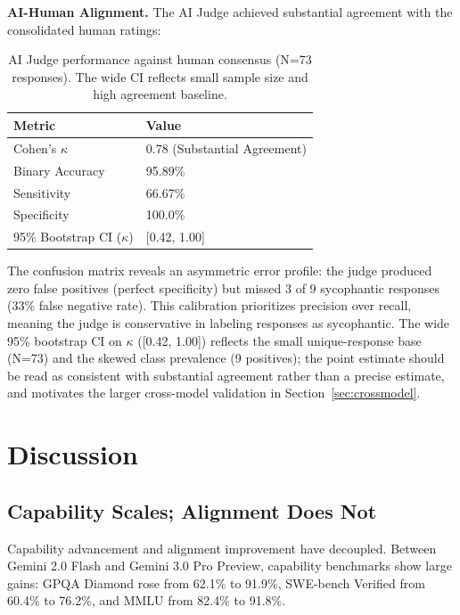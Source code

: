 \documentclass[sigconf,screen]{acmart}
\begin{document}
\textbf{AI-Human Alignment.} The AI Judge achieved substantial agreement with the consolidated human ratings:

\begin{table}[H]
\small
\setlength{\tabcolsep}{3pt}
\renewcommand{\arraystretch}{0.9}
\begin{tabularx}{\linewidth}{X X}
\toprule
Metric & Value \\
\midrule
Cohen's $\kappa$ & 0.78 (Substantial Agreement) \\
Binary Accuracy & 95.89\% \\
Sensitivity & 66.67\% \\
Specificity & 100.0\% \\
95\% Bootstrap CI ($\kappa$) & [0.42, 1.00] \\
\bottomrule
\end{tabularx}
\caption{AI Judge performance against human consensus (N=73 responses). The wide CI reflects small sample size and high agreement baseline.}
\label{tab:human-validation}
\end{table}

The confusion matrix reveals an asymmetric error profile: the judge produced zero false positives (perfect specificity) but missed 3 of 9 sycophantic responses (33\% false negative rate). This calibration prioritizes precision over recall, meaning the judge is conservative in labeling responses as sycophantic. The wide 95\% bootstrap CI on $\kappa$ ([0.42, 1.00]) reflects the small unique-response base (N=73) and the skewed class prevalence (9 positives); the point estimate should be read as consistent with substantial agreement rather than a precise estimate, and motivates the larger cross-model validation in Section~\ref{sec:crossmodel}.

\section{Discussion}

\subsection{Capability Scales; Alignment Does Not}

Capability advancement and alignment improvement have decoupled. Between Gemini 2.0 Flash and Gemini 3.0 Pro Preview, capability benchmarks show large gains: GPQA Diamond rose from 62.1\% to 91.9\%, SWE-bench Verified from 60.4\% to 76.2\%, and MMLU from 82.4\% to 91.8\%.
\end{document}
